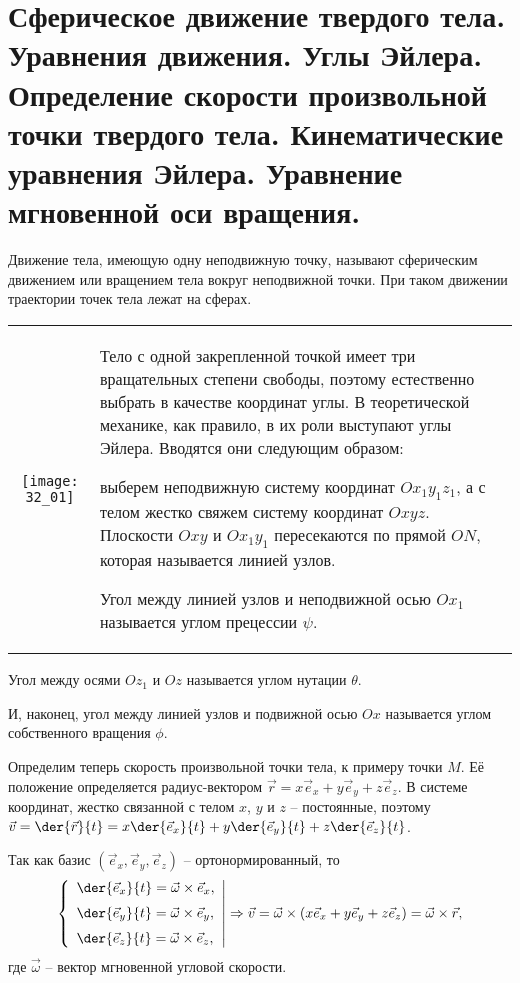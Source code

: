 \chapter{Сферическое движение твердого тела. Уравнения движения. Углы Эйлера.
Определение скорости произвольной точки твердого тела. Кинематические
уравнения Эйлера. Уравнение мгновенной оси вращения.}

Движение тела, имеющую одну неподвижную точку, называют сферическим движением
или вращением тела вокруг неподвижной точки. При таком движении траектории точек
тела лежат на сферах.

\begin{table}[h!]
    \vspace*{-1em}
    \begin{tabular}{C{.4}m{.55\textwidth}}
        \texttt{[image: 32\_01]} &
        Тело с одной закрепленной точкой имеет три вращательных степени свободы,
        поэтому естественно выбрать в качестве координат углы. В теоретической
        механике, как правило, в их роли выступают углы Эйлера. Вводятся они
        следующим образом:

        выберем неподвижную систему координат \( Ox_1y_1z_1 \), а с телом жестко
        свяжем систему координат \( Oxyz \). Плоскости \( Oxy \) и \( Ox_1y_1 \)
        пересекаются по прямой \( ON \), которая называется линией узлов.

        Угол между линией узлов и неподвижной осью \( Ox_1 \) называется углом
        прецессии \( \psi \).
    \end{tabular}
    \vspace*{-1em}
\end{table}
Угол между осями \( Oz_1 \) и \( Oz \) называется углом нутации \( \theta \).

И, наконец,
угол между линией узлов и подвижной осью \( Ox \) называется углом собственного
вращения \( \phi \).

Определим теперь скорость произвольной точки тела, к примеру точки \( M \). Её
положение определяется радиус-вектором \( \vec{r} = x\vec{e}_x + y\vec{e}_y +
z\vec{e}_z \). В системе координат, жестко связанной с телом \( x \), \( y \) и
\( z \) -- постоянные, поэтому
\( \ds \vec{v} = \der{\vec{r}}{t} = x\der{\vec{e}_x}{t} + y\der{\vec{e}_y}{t} +
z\der{\vec{e}_z}{t} \).

Так как базис \( (\vec{e}_x, \vec{e}_y, \vec{e}_z) \) -- ортонормированный, то
\[
    \left\{ \begin{array}{l}
        \ds\der{\vec{e}_x}{t} = \vec{\omega}\times\vec{e}_x, \\[.6em]
        \ds\der{\vec{e}_y}{t} = \vec{\omega}\times\vec{e}_y, \\[.6em]
        \ds\der{\vec{e}_z}{t} = \vec{\omega}\times\vec{e}_z,
    \end{array} \right| \Rightarrow
    \vec{v} = \vec{\omega}\times(x\vec{e}_x + y\vec{e}_y + z\vec{e}_z) =
    \vec{\omega}\times\vec{r},
\]
где \( \vec{\omega} \) -- вектор мгновенной угловой скорости.

